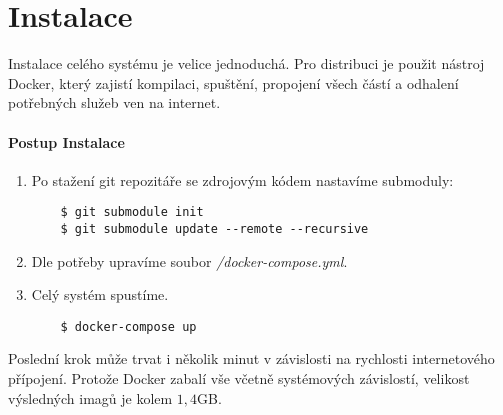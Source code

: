 
\chapter{Instalace} \label{analyza}

Instalace celého systému je velice jednoduchá. Pro distribuci je použit nástroj
Docker, který zajistí kompilaci, spuštění, propojení všech částí a odhalení
potřebných služeb ven na internet. \citep[viz][]{DockerDocs}


\subsubsection*{Postup Instalace}

\begin{enumerate}
  \item Po stažení git repozitáře se zdrojovým kódem nastavíme submoduly:\\
  \begin{lstlisting}
    $ git submodule init
    $ git submodule update --remote --recursive
  \end{lstlisting}
  \item Dle potřeby upravíme soubor \textit{/docker-compose.yml}.
  \item Celý systém spustíme.\\
  \begin{lstlisting}
    $ docker-compose up
  \end{lstlisting}
\end{enumerate}

Poslední krok může trvat i několik minut v závislosti na rychlosti internetového
přípojení. Protože Docker zabalí vše včetně systémových závislostí, velikost
výsledných imagů je kolem $1,4$GB.
